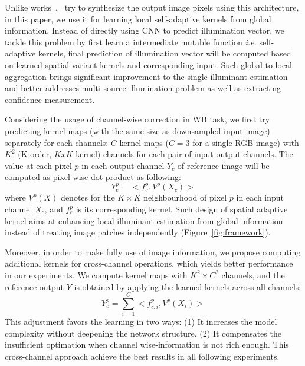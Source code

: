 \documentclass[10pt,twocolumn,letterpaper]{article}
\begin{document}
Unlike works~\cite{DBLP:journals/corr/RonnebergerFB15},~\cite{isola2017image} try to
synthesize the output image pixels using this architecture,
in this paper, we use it for learning local self-adaptive kernels from global information.
Instead of directly using CNN to predict illumination vector,
we tackle this problem by first learn a intermediate mutable function \textit{i.e.} self-adaptive kernels,
final prediction of illumination vector will be computed based on learned spatial variant kernels and corresponding input.
Such global-to-local aggregation brings significant improvement to the single illuminant estimation
and better addresses multi-source illumination problem as well as extracting confidence measurement.


Considering the usage of channel-wise correction in WB task,
we first try predicting kernel maps (with the same size as downsampled input image) separately for each channels:
$C$ kernel maps ($C=3$ for a single RGB image) with $K^2$ (K-order, $KxK$ kernel) channels for each pair of input-output channels.
The value at each pixel $p$ in each output channel $Y_c$ of reference image will be computed as pixel-wise dot product as following:
\begin{equation}
Y^p_c = <f^p_c, V^p(X_c)>
\end{equation}
where $V^p(X)$ denotes for the $K\times{K}$ neighbourhood of pixel $p$ in each input channel $X_c$, and $f^p_c$ is its corresponding kernel.
Such design of spatial adaptive kernel aims at enhancing local illuminant estimation from global information
instead of treating image patches independently (Figure~\ref{fig:framework}).

Moreover, in order to make fully use of image information,
we propose computing additional kernels for cross-channel operations,
which yields better performance in our experiments.
We compute kernel maps with $K^2\times{C^2}$ channels, and the reference output
$Y$ is obtained by applying the learned kernels across all channels:
\begin{equation}
Y^p_c = \sum_{i=1}^{C}<f^p_{c,i}, V^p(X_i)>
\label{eq:kpn}
\end{equation}
This adjustment favors the learning in two ways:
(1) It increases the model complexity without deepening the network structure.
(2) It compensates the insufficient optimation when channel wise-information is not rich enough.
This cross-channel approach achieve the best results in all following experiments.
\end{document}
